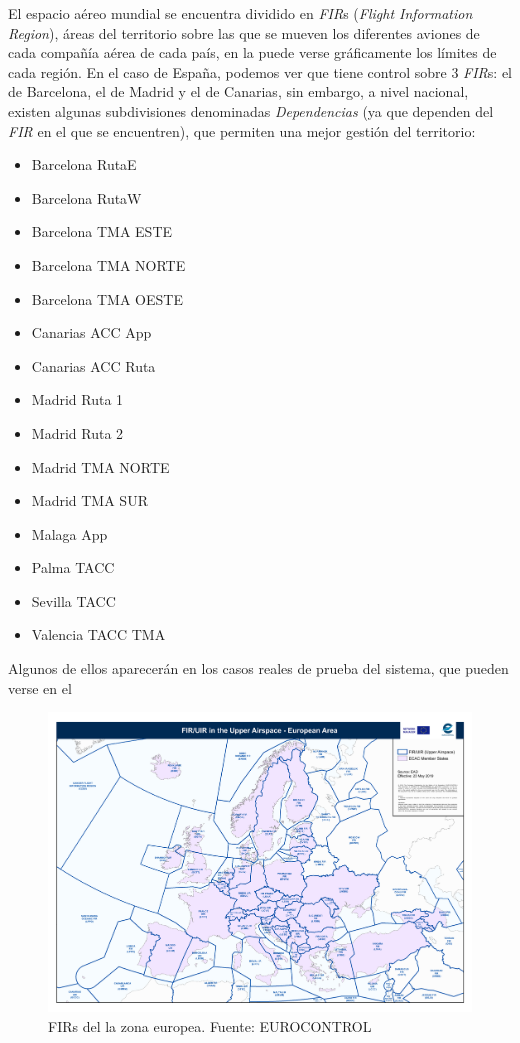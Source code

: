 El espacio aéreo mundial se encuentra dividido en \textit{FIR}s (\textit{Flight Information Region}), áreas del territorio sobre las que se mueven los diferentes aviones de cada compañía aérea de cada país, en la  puede verse gráficamente los límites de cada región. En el caso de España, podemos ver que tiene control sobre 3 \textit{FIR}s: el de Barcelona, el de Madrid y el de Canarias, sin embargo, a nivel nacional, existen algunas subdivisiones denominadas \textit{Dependencias} (ya que dependen del \textit{FIR} en el que se encuentren), que permiten una mejor gestión del territorio:
\begin{itemize}
	\item Barcelona RutaE
	\item Barcelona RutaW
	\item Barcelona TMA ESTE
	\item Barcelona TMA NORTE
	\item Barcelona TMA OESTE
	\item Canarias ACC App
	\item Canarias ACC Ruta
	\item Madrid Ruta 1
	\item Madrid Ruta 2
	\item Madrid TMA NORTE
	\item Madrid TMA SUR
	\item Malaga App
	\item Palma TACC
	\item Sevilla TACC
	\item  Valencia TACC TMA
\end{itemize}

Algunos de ellos aparecerán en los casos reales de prueba del sistema, que pueden verse en el 
\begin{figure}
	\centering
	\includegraphics[width=1\linewidth]{FIR_europa}
	\caption{FIRs del la zona europea. Fuente: EUROCONTROL}
	\label{fig:fireuropa}
\end{figure}


